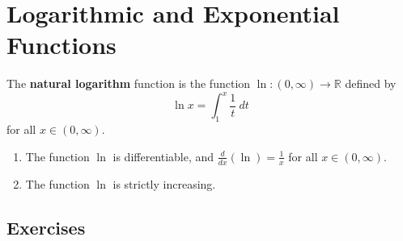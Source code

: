\section{Logarithmic and Exponential Functions}
\begin{definition}
	\label{definition-7.2.1}
	The \textbf{natural logarithm} function is the function $\ln : \left( 0, \infty \right) \to \mathbb{R}$ defined by
	\begin{equation}
	\ln x = \int_{1}^{x}\frac{1}{t}\ dt
	\end{equation}
	for all $x \in \left(0, \infty\right)$.
\end{definition}

\begin{theorem}
	\label{theorem-7.2.2}
	{\color{white}{content...}}
	\begin{enumerate}
		\item The function $\ln$ is differentiable, and $\frac{d}{dx}\left(\ln\right) = \frac{1}{x}$ for all $x \in \left( 0, \infty \right)$.
		\item The function $\ln$ is strictly increasing.
	\end{enumerate}
\end{theorem}

\subsection{Exercises}
\setcounter{exercise}{6}

